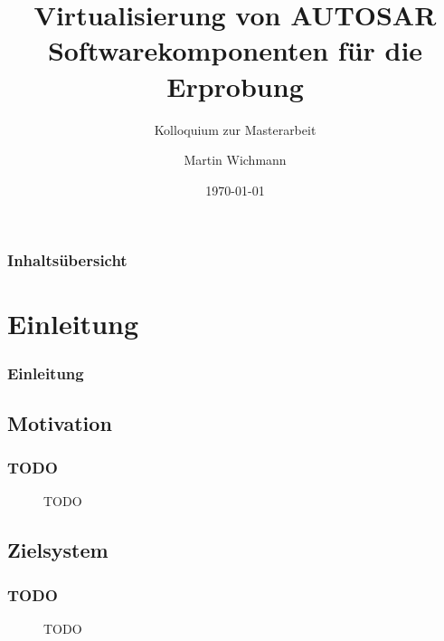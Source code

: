 \documentclass[draft]{beamer}
\author{Martin Wichmann}
\title[Virtualisierung von AUTOSAR Softwarekomponenten]{Virtualisierung von AUTOSAR Softwarekomponenten für die Erprobung}
\subtitle{Kolloquium zur Masterarbeit}
\date{\today}
\institute{Ostfalia Hochschule für angewandte Wissenschaften}
\newcommand{\inputImage}[1]{}
\begin{document}
\begin{frame}
\maketitle
\end{frame}


\begin{frame}
\frametitle{Inhaltsübersicht}
\tableofcontents[hideallsubsections] %
\end{frame}





\section{Einleitung}
\label{sec:einleitung}

\begin{frame}
\frametitle{Einleitung}
\end{frame}

\subsection{Motivation}
\begin{frame}
\frametitle{TODO}
    \begin{figure}[ht]
        \centering
        \resizebox{\linewidth}{!}{\inputImage{gantt}}
        \caption{TODO}
        \label{fig:TODO}
    \end{figure}
\end{frame}

\subsection{Zielsystem}
\begin{frame}
\frametitle{TODO}
    \begin{figure}[ht]
        \centering
        \resizebox{\linewidth}{!}{\inputImage{arch_begin.dia}}
        \caption{TODO}
        \label{fig:TODO}
    \end{figure}
\end{frame}



\end{document}
